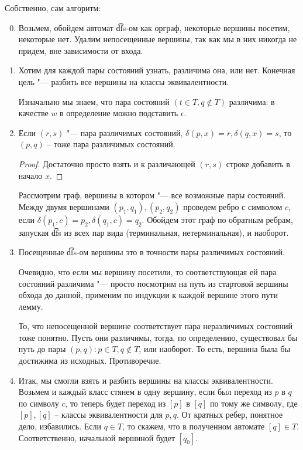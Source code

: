 Собственно, сам алгоритм:
\begin{enumerate}
\setcounter{enumi}{-1}
\item
Возьмем, обойдем автомат \t{dfs}-ом как орграф, некоторые вершины посетим, некоторые нет. 
Удалим непосещенные вершины, так как мы в них никогда не придем, вне зависимости от входа.

\item
Хотим для каждой пары состояний узнать, различима она, или нет. Конечная цель "--- разбить все вершины на классы эквивалентности.

Изначально мы знаем, что пара состояний $(t \in T, q \notin T)$ различима: в качестве $w$ в определение можно подставить $\epsilon$.

\item
\begin{lemma}
Если $(r, s)$ "--- пара различимых состояний, $\delta(p, x) = r, \delta(q, x) = s$, то $(p, q)$ -- тоже пара различимых состояний.
\end{lemma}
\begin{proof}
Достаточно просто взять и к различающей $(r, s)$ строке добавить в начало $x$.
\end{proof}

Рассмотрим граф, вершины в котором "--- все возможные пары состояний. Между двумя вершинами $(p_1, q_1), (p_2, q_2)$ проведем ребро с символом $c$, если $\delta(p_1, c) = p_2, \delta(q_1, c) = q_2$.
Обойдем этот граф по обратным ребрам, запуская \t{dfs} из всех пар вида (терминальная, нетерминальная), и наоборот.

\item
Посещенные \t{dfs}-ом вершины это в точности пары различимых состояний. 

Очевидно, что если мы вершину посетили, то соответствующая ей пара состояний различима "--- просто посмотрим на путь из стартовой вершины обхода до данной, применим по индукции к каждой вершине этого пути лемму.

То, что непосещенной вершине соответствует пара неразличимых состояний тоже понятно. 
Пусть они различимы, тогда, по определению, существовал бы путь до пары $(p, q): p \in T, q \notin T$, или наоборот. То есть, вершина была бы достижима из исходных. 
Противоречие.
\item
Итак, мы смогли взять и разбить вершины на классы эквивалентности. 
Возьмем и каждый класс стянем в одну вершину, если был переход из $p$ в $q$ по символу $c$, то теперь будет переход из $[p]$ в $[q]$ по тому же символу, где $[p], [q]$ -- классы эквивалентности для $p, q$. 
От кратных ребер, понятное дело, избавились.
Если $q \in T$, то скажем, что в полученном автомате $[q] \in T$. Соответственно, начальной вершиной будет $[q_0]$.


\end{enumerate}

